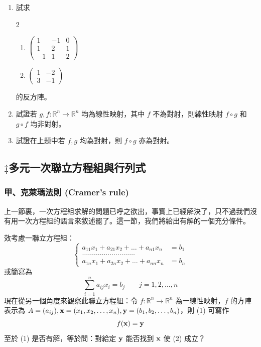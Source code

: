 \begin{enumerate}[label=\arabic*., leftmargin=2em]
  \item 試求
  \begin{multicols}{2}
  \begin{enumerate}[label=(\roman*)]
    \item $\begin{pmatrix} 1 & -1 & 0 \\ 1 & 2 & 1 \\ -1 & 1 & 2 \end{pmatrix}$
    \item $\begin{pmatrix} 1 & -2 \\ 3 & -1 \end{pmatrix}$
  \end{enumerate}
  \end{multicols}
  的反方陣。

  \item[\textbf{**8.}] 試證若 $g, f: \mathbb{R}^n \longrightarrow \mathbb{R}^n$ 均為線性映射，其中 $f$ 不為對射，則線性映射 $f \circ g$ 和 $g \circ f$ 均非對射。

  \item[\textbf{**9.}] 試證在上題中若 $f, g$ 均為對射，則 $f \circ g$ 亦為對射。
\end{enumerate}

\subsection{\texorpdfstring{$\ddagger$}{‡}多元一次聯立方程組與行列式}\label{sec:b6-1-8}
\resetsectcounters

\subsubsection*{甲、克萊瑪法則 (Cramer's rule)}\label{subsec:b6-1-8-a}

上一節裏，一次方程組求解的問題已呼之欲出，事實上已經解決了，只不過我們沒有用一次方程組的語言來敘述罷了。這一節，我們將給出有解的一個充分條件。

效考慮一聯立方程組：
\begin{equation}
\left\{\begin{aligned}
a_{11}x_1 + a_{21}x_2 + \dots + a_{n1}x_n &= b_1 \\
\dots\dots\dots\dots\dots\dots\dots\dots\dots \\
a_{1n}x_1 + a_{2n}x_2 + \dots + a_{nn}x_n &= b_n
\end{aligned}\right. \label{eq:b6-1-8-1}
\end{equation}
或簡寫為
\begin{equation}
\sum_{i=1}^n a_{ij} x_i = b_j \qquad j=1, 2, \dots, n \tag{1$'$} \label{eq:b6-1-8-1p}
\end{equation}
現在從另一個角度來觀察此聯立方程組：令 $f: \mathbb{R}^n \longrightarrow \mathbb{R}^n$ 為一線性映射，$f$ 的方陣表示為 $A=(a_{ij}), \boldsymbol{\mathbf{x}}=(x_1, x_2, \dots, x_n), \boldsymbol{\mathbf{y}}=(b_1, b_2, \dots, b_n)$，則 (1) 可寫作
\begin{equation}
f(\boldsymbol{\mathbf{x}}) = \boldsymbol{\mathbf{y}} \label{eq:b6-1-8-2}
\end{equation}
至於 (1) 是否有解，等於問：對給定 $\boldsymbol{\mathbf{y}}$ 能否找到 $\boldsymbol{\mathbf{x}}$ 使 (2) 成立？

